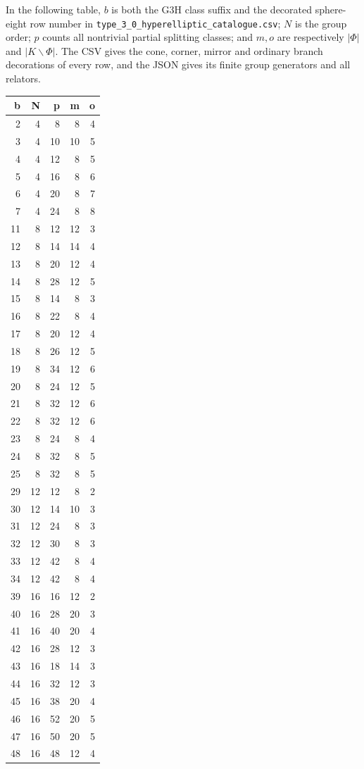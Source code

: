 In the following table, $b$ is both the G3H class suffix and the decorated sphere-eight row number
in \texttt{type\_3\_0\_hyperelliptic\_catalogue.csv}; $N$ is the group
order; $p$ counts all nontrivial partial splitting classes; and $m,o$
are respectively $|\Phi|$ and $|K\backslash\Phi|$.  The CSV gives the
cone, corner, mirror and ordinary branch decorations of every row,
and the JSON gives its finite group generators and all relators.
\begin{longtable}{r|r|r|r|r}
b&N&p&m&o\\\hline
\endhead
2&4&8&8&4\\
3&4&10&10&5\\
4&4&12&8&5\\
5&4&16&8&6\\
6&4&20&8&7\\
7&4&24&8&8\\
11&8&12&12&3\\
12&8&14&14&4\\
13&8&20&12&4\\
14&8&28&12&5\\
15&8&14&8&3\\
16&8&22&8&4\\
17&8&20&12&4\\
18&8&26&12&5\\
19&8&34&12&6\\
20&8&24&12&5\\
21&8&32&12&6\\
22&8&32&12&6\\
23&8&24&8&4\\
24&8&32&8&5\\
25&8&32&8&5\\
29&12&12&8&2\\
30&12&14&10&3\\
31&12&24&8&3\\
32&12&30&8&3\\
33&12&42&8&4\\
34&12&42&8&4\\
39&16&16&12&2\\
40&16&28&20&3\\
41&16&40&20&4\\
42&16&28&12&3\\
43&16&18&14&3\\
44&16&32&12&3\\
45&16&38&20&4\\
46&16&52&20&5\\
47&16&50&20&5\\
48&16&48&12&4\\

\end{longtable}
